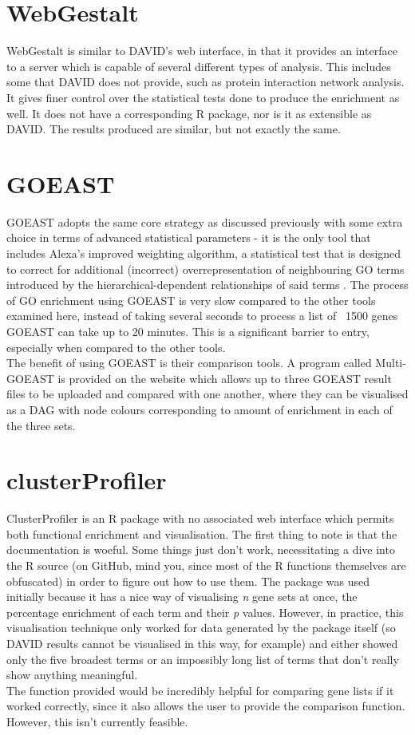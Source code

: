 \documentclass[11pt, oneside]{article}
\begin{document}
\section*{WebGestalt}
WebGestalt is similar to DAVID's web interface, in that it provides an interface to a server which is capable of several different types of analysis. This includes some that DAVID does not provide, such as protein interaction network analysis. It gives finer control over the statistical tests done to produce the enrichment as well. It does not have a corresponding R package, nor is it as extensible as DAVID. The results produced are similar, but not exactly the same.
\section*{GOEAST}
GOEAST adopts the same core strategy as discussed previously with some extra choice in terms of advanced statistical parameters - it is the only tool that includes Alexa's improved weighting algorithm, a statistical test that is designed to correct for additional (incorrect) overrepresentation of neighbouring GO terms introduced by the hierarchical-dependent relationships of said terms \cite{GOEast08}. The process of GO enrichment using GOEAST is very slow compared to the other tools examined here, instead of taking several seconds to process a list of ~1500 genes GOEAST can take up to 20 minutes. This is a significant barrier to entry, especially when compared to the other tools.\\
The benefit of using GOEAST is their comparison tools. A program called Multi-GOEAST is provided on the website which allows up to three GOEAST result files to be uploaded and compared with one another, where they can be visualised as a DAG with node colours corresponding to amount of enrichment in each of the three sets. 
\section*{clusterProfiler}
ClusterProfiler is an R package with no associated web interface which permits both functional enrichment and visualisation. The first thing to note is that the documentation is woeful. Some things just don't work, necessitating a dive into the R source (on GitHub, mind you, since most of the R functions themselves are obfuscated) in order to figure out how to use them. The package was used initially because it has a nice way of visualising \emph{n} gene sets at once, the percentage enrichment of each term and their \emph{p} values. However, in practice, this visualisation technique only worked for data generated by the package itself (so DAVID results cannot be visualised in this way, for example) and either showed only the five broadest terms or an impossibly long list of terms that don't really show anything meaningful.\\
The function provided would be incredibly helpful for comparing gene lists if it worked correctly, since it also allows the user to provide the comparison function. However, this isn't currently feasible.
\end{document}
